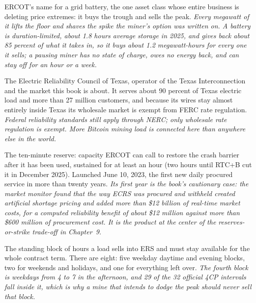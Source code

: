 \begin{description}[leftmargin=0pt,style=unboxed,itemsep=0.35em,parsep=0.15em]
\item[energy storage resource (ESR)] \hypertarget{glossary:energy-storage-resource}{}ERCOT's name for a grid battery, the one asset class whose entire business is deleting price extremes: it buys the trough and sells the peak. \emph{Every megawatt of it lifts the floor and shaves the spike the miner's option was written on. A battery is duration-limited, about 1.8 hours average storage in 2025, and gives back about 85 percent of what it takes in, so it buys about 1.2 megawatt-hours for every one it sells; a pausing miner has no state of charge, owes no energy back, and can stay off for an hour or a week.}
\item[ERCOT] \hypertarget{glossary:ercot}{}The Electric Reliability Council of Texas, operator of the Texas Interconnection and the market this book is about. It serves about 90 percent of Texas electric load and more than 27 million customers, and because its wires stay almost entirely inside Texas its wholesale market is exempt from FERC rate regulation. \emph{Federal reliability standards still apply through NERC; only wholesale rate regulation is exempt. More Bitcoin mining load is connected here than anywhere else in the world.}
\item[ERCOT Contingency Reserve Service (ECRS)] \hypertarget{glossary:ercot-contingency-reserve-service}{}The ten-minute reserve: capacity ERCOT can call to restore the crash barrier after it has been used, sustained for at least an hour (two hours until RTC+B cut it in December 2025). Launched June 10, 2023, the first new daily procured service in more than twenty years. \emph{Its first year is the book's cautionary case: the market monitor found that the way ECRS was procured and withheld created artificial shortage pricing and added more than \$12 billion of real-time market costs, for a computed reliability benefit of about \$12 million against more than \$600 million of procurement cost. It is the product at the center of the reserves-or-strike trade-off in Chapter~9.}
\item[ERS time period] \hypertarget{glossary:ers-time-period}{}The standing block of hours a load sells into ERS and must stay available for the whole contract term. There are eight: five weekday daytime and evening blocks, two for weekends and holidays, and one for everything left over. \emph{The fourth block is weekdays from 4 to 7 in the afternoon, and 29 of the 32 official 4CP intervals fall inside it, which is why a mine that intends to dodge the peak should never sell that block.}

\end{description}
